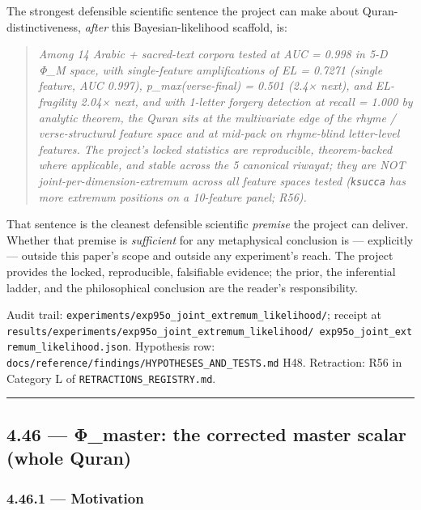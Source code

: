 \documentclass[
]{article}
\begin{document}
The strongest defensible scientific sentence the project can make about
Quran-distinctiveness, \emph{after} this Bayesian-likelihood scaffold,
is:

\begin{quote}
\emph{Among 14 Arabic + sacred-text corpora tested at AUC = 0.998 in 5-D
Φ\_M space, with single-feature amplifications of EL = 0.7271 (single
feature, AUC 0.997), p\_max(verse-final) = 0.501 (2.4× next), and
EL-fragility 2.04× next, and with 1-letter forgery detection at recall =
1.000 by analytic theorem, the Quran sits at the multivariate edge of
the rhyme / verse-structural feature space and at mid-pack on
rhyme-blind letter-level features. The project's locked statistics are
reproducible, theorem-backed where applicable, and stable across the 5
canonical riwayat; they are NOT joint-per-dimension-extremum across all
feature spaces tested (\texttt{ksucca} has more extremum positions on a
10-feature panel; R56).}
\end{quote}

That sentence is the cleanest defensible scientific \emph{premise} the
project can deliver. Whether that premise is \emph{sufficient} for any
metaphysical conclusion is --- explicitly --- outside this paper's scope
and outside any experiment's reach. The project provides the locked,
reproducible, falsifiable evidence; the prior, the inferential ladder,
and the philosophical conclusion are the reader's responsibility.

Audit trail: \texttt{experiments/exp95o\_joint\_extremum\_likelihood/};
receipt at
\texttt{results/experiments/exp95o\_joint\_extremum\_likelihood/\ exp95o\_joint\_extremum\_likelihood.json}.
Hypothesis row:
\texttt{docs/reference/findings/HYPOTHESES\_AND\_TESTS.md} H48.
Retraction: R56 in Category L of \texttt{RETRACTIONS\_REGISTRY.md}.

\begin{center}\rule{0.5\linewidth}{0.5pt}\end{center}

\subsection{4.46 --- Φ\_master: the corrected master scalar (whole
Quran)}\label{ux3c6_master-the-corrected-master-scalar-whole-quran}

\subsubsection{4.46.1 --- Motivation}\label{motivation-1}
\end{document}
